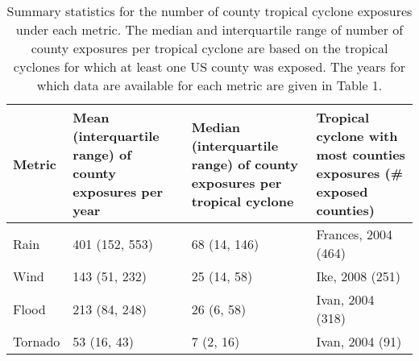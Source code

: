 \begin{table}[ht]
\centering
\caption{Summary statistics for the number of county tropical cyclone exposures under each metric.     
	 The median and interquartile range of number of county exposures per tropical cyclone are based on
         the tropical cyclones for which at least one US county was exposed. The years for which
         data are available for each metric are given in Table 1.} 
\label{tab:exposuresummaries}
\begin{tabular}{p{1.75cm}p{3cm}p{4cm}p{4cm}}
  \toprule
Metric & Mean (interquartile range) of county exposures per year & Median (interquartile range) of county exposures per tropical cyclone & Tropical cyclone with most counties exposures (\# exposed counties) \\ 
  \midrule
Rain & 401 (152, 553) & 68 (14, 146) & Frances, 2004 (464) \\ 
  Wind & 143 (51, 232) & 25 (14, 58) & Ike, 2008 (251) \\ 
  Flood & 213 (84, 248) & 26 (6, 58) & Ivan, 2004 (318) \\ 
  Tornado & 53 (16, 43) & 7 (2, 16) & Ivan, 2004 (91) \\ 
   \bottomrule
\end{tabular}
\end{table}
